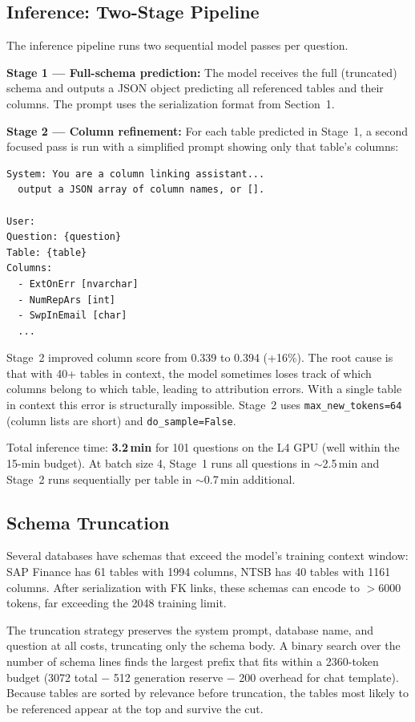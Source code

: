 \documentclass[10pt,twocolumn]{article}
\begin{document}
\subsection*{Inference: Two-Stage Pipeline}
The inference pipeline runs two sequential model passes per question.

\textbf{Stage 1 — Full-schema prediction:} The model receives the full (truncated) schema and outputs a JSON object predicting all referenced tables and their columns. The prompt uses the serialization format from Section~1.

\textbf{Stage 2 — Column refinement:} For each table predicted in Stage~1, a second focused pass is run with a simplified prompt showing only that table's columns:
\begin{verbatim}
System: You are a column linking assistant...
  output a JSON array of column names, or [].

User:
Question: {question}
Table: {table}
Columns:
  - ExtOnErr [nvarchar]
  - NumRepArs [int]
  - SwpInEmail [char]
  ...
\end{verbatim}
Stage~2 improved column score from 0.339 to 0.394 (+16\%). The root cause is that with 40+ tables in context, the model sometimes loses track of which columns belong to which table, leading to attribution errors. With a single table in context this error is structurally impossible. Stage~2 uses \texttt{max\_new\_tokens=64} (column lists are short) and \texttt{do\_sample=False}.

Total inference time: \textbf{3.2\,min} for 101 questions on the L4 GPU (well within the 15-min budget). At batch size 4, Stage~1 runs all questions in $\sim$2.5\,min and Stage~2 runs sequentially per table in $\sim$0.7\,min additional.

\subsection*{Schema Truncation}
Several databases have schemas that exceed the model's training context window: SAP Finance has 61 tables with 1994 columns, NTSB has 40 tables with 1161 columns. After serialization with FK links, these schemas can encode to $>$6000 tokens, far exceeding the 2048 training limit.

The truncation strategy preserves the system prompt, database name, and question at all costs, truncating only the schema body. A binary search over the number of schema lines finds the largest prefix that fits within a 2360-token budget (3072 total $-$ 512 generation reserve $-$ 200 overhead for chat template). Because tables are sorted by relevance before truncation, the tables most likely to be referenced appear at the top and survive the cut.
\end{document}
